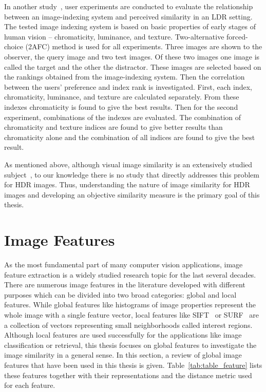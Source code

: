 In another study~\cite{neumann2006image}, user experiments are conducted to evaluate the relationship between an image-indexing system and perceived similarity in an LDR setting. The tested image indexing system is based on basic properties of early stages of human vision -- chromaticity, luminance, and texture. Two-alternative forced-choice (2AFC) method is used for all experiments. Three images are shown to the observer, the query image and two test images. Of these two images one image is called the target and the other the distractor. These images are selected based on the rankings obtained from the image-indexing system. Then the correlation between the users' preference and index rank is investigated. First, each index, chromaticity, luminance, and texture are calculated separately. From these indexes chromaticity is found to give the best results. Then for the second experiment, combinations of the indexes are evaluated. The combination of chromaticity and texture indices are found to give better results than chromaticity alone and the combination of all indices are found to give the best result.

As mentioned above, although visual image similarity is an extensively studied subject~\cite{liu2007survey}, to our knowledge there is no study that directly addresses this problem for HDR images. Thus, understanding the nature of image similarity for HDR images and developing an objective similarity measure is the primary goal of this thesis. 

\section{Image Features}
\label{sec:features}
As the most fundamental part of many computer vision applications, image feature extraction is a widely studied research topic for the last several decades. There are numerous image features in the literature developed with different purposes which can be divided into two broad categories: global and local features. While global features like histograms of image properties represent the whole image with a single feature vector, local features like SIFT~\cite{lowe2004distinctive} or SURF~\cite{bay2006surf} are a collection of vectors representing small neighborhoods called interest regions. Although local features are used successfully for the applications like image classification or retrieval, this thesis focuses on global features to investigate the image similarity in a general sense. In this section, a review of global image features that have been used in this thesis is given. Table~\ref{tab:table_feature} lists these features together with their representations and the distance metric used for each feature. 

